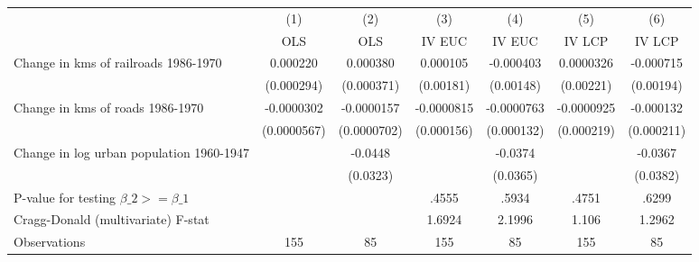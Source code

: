 {
\def\sym#1{\ifmmode^{#1}\else\(^{#1}\)\fi}
\begin{tabular}{l*{6}{c}}
\hline\hline
                &\multicolumn{1}{c}{(1)}&\multicolumn{1}{c}{(2)}&\multicolumn{1}{c}{(3)}&\multicolumn{1}{c}{(4)}&\multicolumn{1}{c}{(5)}&\multicolumn{1}{c}{(6)}\\
                &\multicolumn{1}{c}{OLS}&\multicolumn{1}{c}{OLS}&\multicolumn{1}{c}{IV EUC}&\multicolumn{1}{c}{IV EUC}&\multicolumn{1}{c}{IV LCP}&\multicolumn{1}{c}{IV LCP}\\
\hline
Change in kms of railroads 1986-1970& 0.000220         & 0.000380         & 0.000105         &-0.000403         &0.0000326         &-0.000715         \\
                &(0.000294)         &(0.000371)         &(0.00181)         &(0.00148)         &(0.00221)         &(0.00194)         \\
[1em]
Change in kms of roads 1986-1970&-0.0000302         &-0.0000157         &-0.0000815         &-0.0000763         &-0.0000925         &-0.000132         \\
                &(0.0000567)         &(0.0000702)         &(0.000156)         &(0.000132)         &(0.000219)         &(0.000211)         \\
[1em]
Change in log urban population 1960-1947&                  &  -0.0448         &                  &  -0.0374         &                  &  -0.0367         \\
                &                  & (0.0323)         &                  & (0.0365)         &                  & (0.0382)         \\
\hline
P-value for testing $\beta\_{2} >= \beta\_{1}$&                  &                  &    .4555         &    .5934         &    .4751         &    .6299         \\
Cragg-Donald (multivariate) F-stat&                  &                  &   1.6924         &   2.1996         &    1.106         &   1.2962         \\
Observations    &      155         &       85         &      155         &       85         &      155         &       85         \\
\hline\hline
\end{tabular}
}
